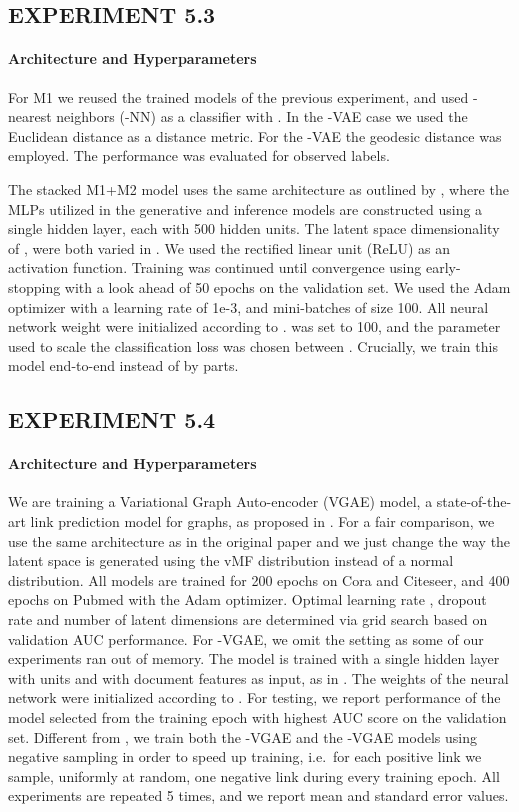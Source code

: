 \documentclass[letterpaper]{article}
\begin{document}
\subsection{EXPERIMENT 5.3}
\paragraph{Architecture and Hyperparameters}
For M1 we reused the trained models of the previous experiment, and used -nearest neighbors (-NN) as a classifier with . In the -VAE case we used the Euclidean distance as a distance metric. For the \Sv-VAE the geodesic distance  was employed. The performance was evaluated for  observed labels.

The stacked M1+M2 model uses the same architecture as outlined by \cite{kingma-semi-super}, where the MLPs utilized in the generative and inference models are constructed using a single hidden layer, each with 500 hidden units. The latent space dimensionality of ,  were both varied in . We used the rectified linear unit (ReLU) as an activation function. Training was continued until convergence using early-stopping with a look ahead of 50 epochs on the validation set. We used the Adam optimizer with a learning rate of 1e-3, and mini-batches of size 100. All neural network weight were initialized according to \citep{glorot2010understanding}.  was set to 100, and the  parameter used to scale the classification loss was chosen between . Crucially, we train this model end-to-end instead of by parts.

\subsection{EXPERIMENT 5.4}\label{ap:link-pred}
\paragraph{Architecture and Hyperparameters} We are training a Variational Graph Auto-encoder (VGAE) model, a state-of-the-art link prediction model for graphs, as proposed in \citet{kipf2016VGAE}. For a fair comparison, we use the same architecture as in the original paper and we just change the way the latent space is generated using the vMF distribution instead of a normal distribution. All models are trained for 200 epochs on Cora and Citeseer, and 400 epochs on Pubmed with the Adam optimizer. Optimal learning rate , dropout rate  and number of latent dimensions  are determined via grid search based on validation AUC performance. For \Sv-VGAE, we omit the  setting as some of our experiments ran out of memory. The model is trained with a single hidden layer with  units and with document features as input, as in \citet{kipf2016VGAE}. The weights of the neural network were initialized according to \citep{glorot2010understanding}. For testing, we report performance of the model selected from the training epoch with highest AUC score on the validation set. Different from \citep{kipf2016VGAE}, we train both the \Nv-VGAE and the \Sv-VGAE models using negative sampling in order to speed up training, i.e.~for each positive link we sample, uniformly at random, one negative link during every training epoch. All experiments are repeated 5 times, and we report mean and standard error values.
\end{document}
